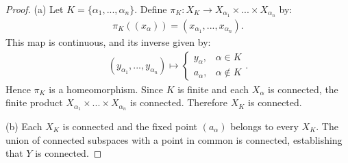 \documentclass[10pt,twoside,openany]{memoir}
\begin{document}
    \begin{proof}
        (a) Let $K = \{\alpha_1,...,\alpha_n\}$. Define $\pi_K:X_K \rightarrow X_{\alpha_1} \times ... \times X_{\alpha_n}$ by:
            \begin{equation*}
            \begin{split}
                \pi_K((x_\alpha)) = (x_{\alpha_1},...,x_{\alpha_n}).
            \end{split}
            \end{equation*}
        This map is continuous, and its inverse given by:
            \begin{equation*}
            \begin{split}
                (y_{\alpha_1},...,y_{\alpha_n}) \mapsto \begin{cases}
                y_\alpha,& \alpha \in K\\
                a_\alpha, &\alpha \not\in K
                \end{cases}.
            \end{split}
            \end{equation*}
        Hence $\pi_K$ is a homeomorphism. Since $K$ is finite and each $X_\alpha$ is connected, the finite product $X_{\alpha_1} \times ... \times X_{\alpha_n}$ is connected. Therefore $X_K$ is connected.

        (b) Each $X_K$ is connected and the fixed point $(a_\alpha)$ belongs to every $X_K$. The union of connected subspaces with a point in common is connected, establishing that $Y$ is connected.


\end{proof}
\end{document}
